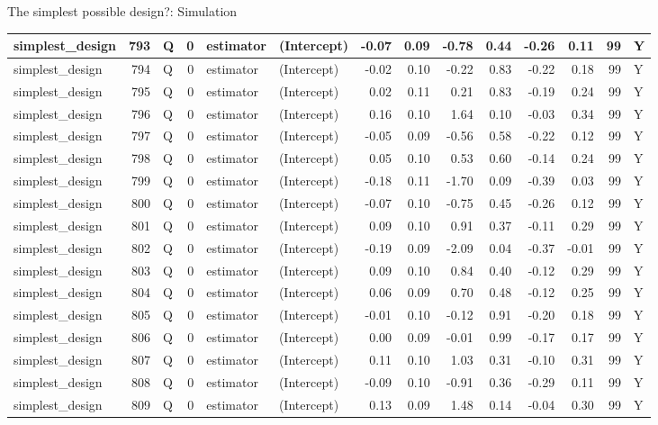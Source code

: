 \documentclass[
  11pt,
  ignorenonframetext,
]{beamer}
\begin{document}
\begin{frame}[fragile]{The simplest possible design?: Simulation}
\begin{tabular}{l|r|l|r|l|l|r|r|r|r|r|r|r|l}
\hline
simplest\_design & 793 & Q & 0 & estimator & (Intercept) & -0.07 & 0.09 & -0.78 & 0.44 & -0.26 & 0.11 & 99 & Y\\
\hline
simplest\_design & 794 & Q & 0 & estimator & (Intercept) & -0.02 & 0.10 & -0.22 & 0.83 & -0.22 & 0.18 & 99 & Y\\
\hline
simplest\_design & 795 & Q & 0 & estimator & (Intercept) & 0.02 & 0.11 & 0.21 & 0.83 & -0.19 & 0.24 & 99 & Y\\
\hline
simplest\_design & 796 & Q & 0 & estimator & (Intercept) & 0.16 & 0.10 & 1.64 & 0.10 & -0.03 & 0.34 & 99 & Y\\
\hline
simplest\_design & 797 & Q & 0 & estimator & (Intercept) & -0.05 & 0.09 & -0.56 & 0.58 & -0.22 & 0.12 & 99 & Y\\
\hline
simplest\_design & 798 & Q & 0 & estimator & (Intercept) & 0.05 & 0.10 & 0.53 & 0.60 & -0.14 & 0.24 & 99 & Y\\
\hline
simplest\_design & 799 & Q & 0 & estimator & (Intercept) & -0.18 & 0.11 & -1.70 & 0.09 & -0.39 & 0.03 & 99 & Y\\
\hline
simplest\_design & 800 & Q & 0 & estimator & (Intercept) & -0.07 & 0.10 & -0.75 & 0.45 & -0.26 & 0.12 & 99 & Y\\
\hline
simplest\_design & 801 & Q & 0 & estimator & (Intercept) & 0.09 & 0.10 & 0.91 & 0.37 & -0.11 & 0.29 & 99 & Y\\
\hline
simplest\_design & 802 & Q & 0 & estimator & (Intercept) & -0.19 & 0.09 & -2.09 & 0.04 & -0.37 & -0.01 & 99 & Y\\
\hline
simplest\_design & 803 & Q & 0 & estimator & (Intercept) & 0.09 & 0.10 & 0.84 & 0.40 & -0.12 & 0.29 & 99 & Y\\
\hline
simplest\_design & 804 & Q & 0 & estimator & (Intercept) & 0.06 & 0.09 & 0.70 & 0.48 & -0.12 & 0.25 & 99 & Y\\
\hline
simplest\_design & 805 & Q & 0 & estimator & (Intercept) & -0.01 & 0.10 & -0.12 & 0.91 & -0.20 & 0.18 & 99 & Y\\
\hline
simplest\_design & 806 & Q & 0 & estimator & (Intercept) & 0.00 & 0.09 & -0.01 & 0.99 & -0.17 & 0.17 & 99 & Y\\
\hline
simplest\_design & 807 & Q & 0 & estimator & (Intercept) & 0.11 & 0.10 & 1.03 & 0.31 & -0.10 & 0.31 & 99 & Y\\
\hline
simplest\_design & 808 & Q & 0 & estimator & (Intercept) & -0.09 & 0.10 & -0.91 & 0.36 & -0.29 & 0.11 & 99 & Y\\
\hline
simplest\_design & 809 & Q & 0 & estimator & (Intercept) & 0.13 & 0.09 & 1.48 & 0.14 & -0.04 & 0.30 & 99 & Y\\

\end{tabular}
\end{frame}
\end{document}
